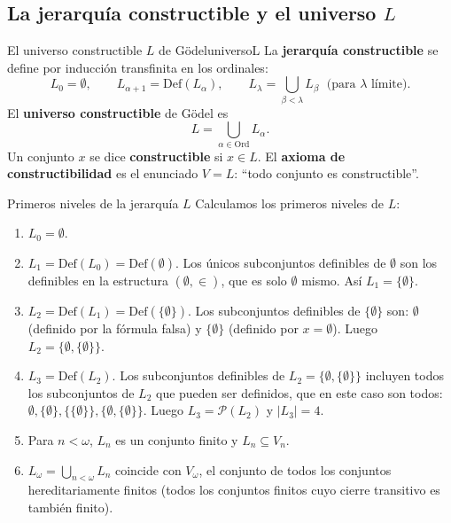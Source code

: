 \subsection{La jerarquía constructible y el universo \texorpdfstring{$L$}{L}}

\begin{definicion}{El universo constructible $L$ de Gödel}{universoL}
La \textbf{jerarquía constructible} se define por inducción transfinita en los ordinales:
\[
  L_0 = \emptyset, \qquad
  L_{\alpha+1} = \mathrm{Def}(L_\alpha), \qquad
  L_\lambda = \bigcup_{\beta < \lambda} L_\beta \;\text{ (para } \lambda \text{ límite)}.
\]
El \textbf{universo constructible} de Gödel es
\[
  L = \bigcup_{\alpha \in \mathrm{Ord}} L_\alpha.
\]
Un conjunto $x$ se dice \textbf{constructible} si $x \in L$. El \textbf{axioma de constructibilidad} es el enunciado $V = L$: ``todo conjunto es constructible''.
\end{definicion}

\begin{ejemplo}{Primeros niveles de la jerarquía $L$}{}
Calculamos los primeros niveles de $L$:
\begin{enumerate}[leftmargin=2em, label=(\alph*)]
  \item $L_0 = \emptyset$.
  \item $L_1 = \mathrm{Def}(L_0) = \mathrm{Def}(\emptyset)$. Los únicos subconjuntos definibles de $\emptyset$ son los definibles en la estructura $(\emptyset, \in)$, que es solo $\emptyset$ mismo. Así $L_1 = \{\emptyset\}$.
  \item $L_2 = \mathrm{Def}(L_1) = \mathrm{Def}(\{\emptyset\})$. Los subconjuntos definibles de $\{\emptyset\}$ son: $\emptyset$ (definido por la fórmula falsa) y $\{\emptyset\}$ (definido por $x = \emptyset$). Luego $L_2 = \{\emptyset, \{\emptyset\}\}$.
  \item $L_3 = \mathrm{Def}(L_2)$. Los subconjuntos definibles de $L_2 = \{\emptyset, \{\emptyset\}\}$ incluyen todos los subconjuntos de $L_2$ que pueden ser definidos, que en este caso son todos: $\emptyset, \{\emptyset\}, \{\{\emptyset\}\}, \{\emptyset, \{\emptyset\}\}$. Luego $L_3 = \mathcal{P}(L_2)$ y $|L_3| = 4$.
  \item Para $n < \omega$, $L_n$ es un conjunto finito y $L_n \subseteq V_n$.
  \item $L_\omega = \bigcup_{n < \omega} L_n$ coincide con $V_\omega$, el conjunto de todos los conjuntos hereditariamente finitos (todos los conjuntos finitos cuyo cierre transitivo es también finito).
\end{enumerate}
\end{ejemplo}

